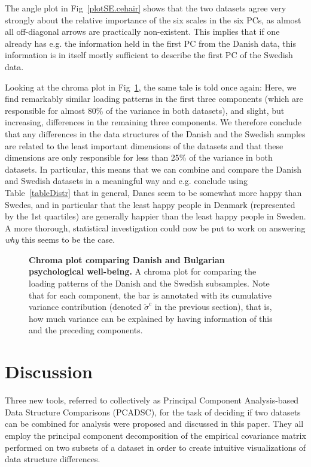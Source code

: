 \documentclass[a4paper,14pt]{article}
\begin{document}
The angle plot in Fig~\ref{plotSE.cehair} shows that the two datasets agree very strongly about the relative importance of the six scales in the six PCs, as almost all off-diagonal arrows are practically non-existent. This implies that if one already has e.g. the information held in the first PC from the Danish data, this information is in itself mostly sufficient to describe the first PC of the Swedish data.

Looking at the chroma plot in Fig~\ref{plotSE.pancake}, the same tale is told once again: Here, we find remarkably similar loading patterns in the first three components (which are responsible for almost 80\% of the variance in both datasets), and slight, but increasing, differences in the remaining three components. We therefore conclude that any differences in the data structures of the Danish and the Swedish samples are related to the least important dimensions of the datasets and that these dimensions are only responsible for less than 25\% of the variance in both datasets. In particular, this means that we can combine and compare the Danish and Swedish datasets in a meaningful way and e.g. conclude using Table~\ref{tableDistr} that in general, Danes seem to be somewhat more happy than Swedes, and in particular that the least happy people in Denmark (represented by the 1st quartiles) are generally happier than the least happy people in Sweden. A more thorough, statistical investigation could now be put to work on answering \textit{why} this seems to be the case.

\begin{figure}[!h]
\caption{{\bf Chroma plot comparing Danish and Bulgarian psychological well-being.} A chroma plot for comparing the loading patterns of the Danish and the Swedish subsamples. Note that for each component, the bar is annotated with its cumulative variance contribution (denoted $\tilde\sigma^c$ in the previous section), that is, how much variance can be explained by having information of this and the preceding components.}
\label{plotSE.pancake}
\end{figure}


\section*{Discussion}\label{sec.Discussion}


Three new tools, referred to collectively as Principal Component Analysis-based Data Structure Comparisons (PCADSC), for the task of deciding if two datasets can be combined for analysis were proposed and discussed in this paper. They all employ the principal component decomposition of the empirical covariance matrix performed on two subsets of a dataset in order to create intuitive visualizations of data structure differences.
\end{document}
